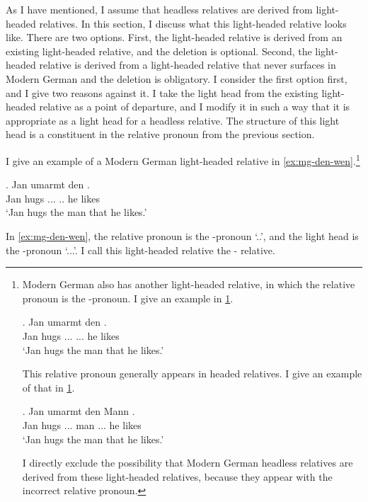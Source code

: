 As I have mentioned, I assume that headless relatives are derived from light-headed relatives. In this section, I discuss what this light-headed relative looks like.
There are two options. First, the light-headed relative is derived from an existing light-headed relative, and the deletion is optional. Second, the light-headed relative is derived from a light-headed relative that never surfaces in Modern German and the deletion is obligatory.
I consider the first option first, and I give two reasons against it. I take the light head from the existing light-headed relative as a point of departure, and I modify it in such a way that it is appropriate as a light head for a headless relative. The structure of this light head is a constituent in the relative pronoun from the previous section.

I give an example of a Modern German light-headed relative in \ref{ex:mg-den-wen}.\footnote{
Modern German also has another light-headed relative, in which the relative pronoun is the -pronoun. I give an example in \ref{ex:mg-den-den}.

\exg. Jan umarmt den   .\\
Jan hugs ... ... he likes\\
`Jan hugs the man that he likes.'\label{ex:mg-den-den}

This relative pronoun generally appears in headed relatives. I give an example of that in \ref{ex:mg-den-headed}.

\exg. Jan umarmt den Mann   .\\
Jan hugs ... man ... he likes\\
`Jan hugs the man that he likes.'\label{ex:mg-den-headed}

I directly exclude the possibility that Modern German headless relatives are derived from these light-headed relatives, because they appear with the incorrect relative pronoun.
}

\exg. Jan umarmt den   .\\
Jan hugs ... .. he likes\\
`Jan hugs the man that he likes.'\label{ex:mg-den-wen}

In \ref{ex:mg-den-wen}, the relative pronoun is the -pronoun  `..', and the light head is the -pronoun  `...'. I call this light-headed relative the - relative.

